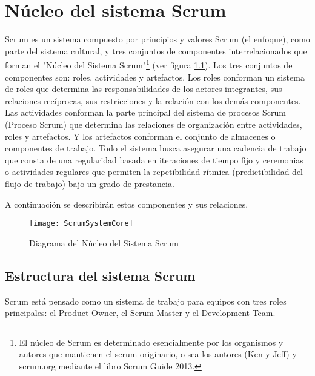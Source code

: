 
\chapter{Núcleo del sistema Scrum}

Scrum es un sistema compuesto por principios y valores Scrum (el enfoque), como parte del sistema cultural, y tres conjuntos de componentes interrelacionados que forman el "Núcleo del Sistema Scrum"\footnote{El núcleo de Scrum es determinado esencialmente por los organismos y autores que mantienen el scrum originario, o sea los autores (Ken y Jeff) y scrum.org mediante el libro Scrum Guide 2013\cite{Ken-Jeff-2013}.} (ver figura \ref{fig:ScrumSystemCore}). Los tres conjuntos de componentes son: roles, actividades y artefactos. Los roles conforman un sistema de roles que determina las responsabilidades de los actores integrantes, sus relaciones recíprocas, sus restricciones y la relación con los demás componentes. Las actividades conforman la parte principal del sistema de procesos Scrum (Proceso Scrum) que determina las relaciones de organización entre actividades, roles y artefactos. Y los artefactos conforman el conjunto de almacenes o componentes de trabajo. Todo el sistema busca asegurar una cadencia de trabajo que consta de una regularidad basada en iteraciones de tiempo fijo y ceremonias o actividades regulares que permiten la repetibilidad rítmica (predictibilidad del flujo de trabajo) bajo un grado de prestancia.

\newpage
A continuación se describirán estos componentes y sus relaciones.

\begin{figure}[h]
  \centering
  \texttt{[image: ScrumSystemCore]}
  \caption{Diagrama del Núcleo del Sistema Scrum}
  \centering
  \label{fig:ScrumSystemCore} %
\end{figure}
\FloatBarrier %

\section{Estructura del sistema Scrum}

Scrum está pensado como un sistema de trabajo para equipos con tres roles principales: el Product Owner, el Scrum Master y el Development Team. 

